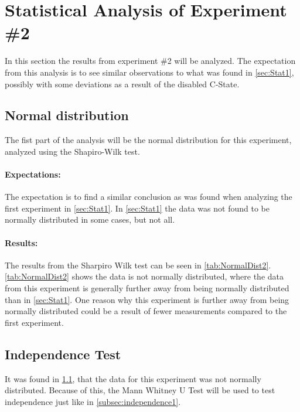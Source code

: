 \section{Statistical Analysis of Experiment \#2}\label{sec:Stat2}
In this section the results from experiment \#2 will be analyzed. The expectation from this analysis is to see similar observations to what was found in \cref{sec:Stat1}, possibly with some deviations as a result of the disabled C-State. 

\subsection{Normal distribution}\label{subsec:NormalDist2}

The fist part of the analysis will be the normal distribution for this experiment, analyzed using the Shapiro-Wilk test.

\paragraph{Expectations:} The expectation is to find a similar conclusion as was found when analyzing the first experiment in \cref{sec:Stat1}. In \cref{sec:Stat1} the data was not found to be normally distributed in some cases, but not all.

 


\paragraph{Results:} The results from the Sharpiro Wilk test can be seen in \cref{tab:NormalDist2}. \cref{tab:NormalDist2} shows the data is not normally distributed, where the data from this experiment is generally further away from being normally distributed than in \cref{sec:Stat1}. One reason why this experiment is further away from being normally distributed could be a result of fewer measurements compared to the first experiment.

\subsection{Independence Test}\label{subsec:independence2}
It was found in \cref{subsec:NormalDist2}, that the data for this experiment was not normally distributed. Because of this, the Mann Whitney U Test will be used to test independence just like in \cref{subsec:independence1}.

